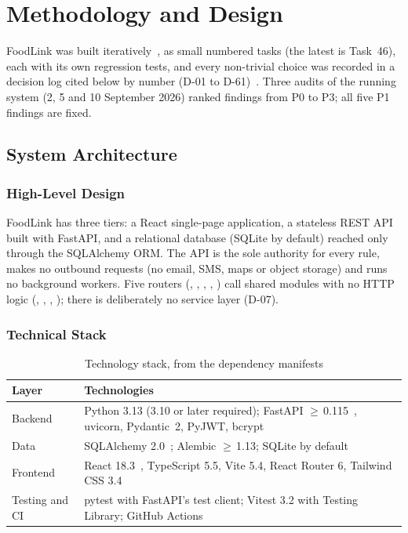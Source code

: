 \chapter{Methodology and Design}
\label{ch:methodology}

FoodLink was built iteratively~\cite{foodlinkProposal,sommerville2016}, as small
numbered tasks (the latest is Task~46), each with its own regression tests, and
every non-trivial choice was recorded in a decision log cited below by number
(D-01 to D-61)~\cite{foodlinkArchitecture}. Three audits of the running system
(2, 5 and 10 September 2026) ranked findings from P0 to P3; all five P1 findings
are fixed.

\section{System Architecture}
\label{sec:architecture}

\subsection{High-Level Design}
\label{sec:hld}

FoodLink has three tiers: a React single-page application, a stateless REST API
built with FastAPI, and a relational database (SQLite by default) reached only
through the SQLAlchemy ORM. The API is the sole authority for every rule, makes
no outbound requests (no email, SMS, maps or object storage) and runs no
background workers. Five routers (, ,
, , ) call shared modules with no
HTTP logic (, , ,
); there is deliberately no service layer (D-07).

\subsection{Technical Stack}
\label{sec:stack}

\begin{table}[!htbp]
\centering
\small
\begin{tabular}{|L{2.6cm}|L{10.7cm}|}
  \hline
  \textbf{Layer} & \textbf{Technologies} \\
  \hline
  Backend & Python 3.13 (3.10 or later required); FastAPI $\geq$\,0.115~\cite{fastapiDocs}, uvicorn, Pydantic~2, PyJWT, bcrypt \\
  \hline
  Data & SQLAlchemy 2.0~\cite{sqlalchemyDocs}; Alembic $\geq$\,1.13; SQLite by default~\cite{sqliteWhenToUse} \\
  \hline
  Frontend & React 18.3~\cite{reactDocs}, TypeScript 5.5, Vite 5.4, React Router 6, Tailwind CSS 3.4 \\
  \hline
  Testing and CI & pytest with FastAPI's test client; Vitest 3.2 with Testing Library; GitHub Actions \\
  \hline
\end{tabular}
\caption{Technology stack, from the dependency manifests}
\label{tab:stack}
\end{table}

